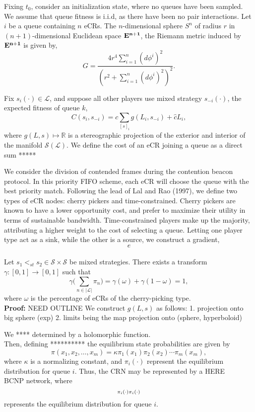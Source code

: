 \documentclass[10pt]{article}
\newcommand{\mcL}{\mathcal{L}}
\newcommand{\mcS}{\mathcal{S}}
\theoremstyle{definition}
\begin{document}
Fixing $t_0$, consider an initialization state, where no queues have been
sampled. We assume that queue fitness is i.i.d, as there
have been no pair interactions. 
Let $i$ be a queue containing $n$ eCRs. The $n$-dimensional sphere $S^n$
of radius $r$ in $(n+1)$-dimensional Euclidean space $\bf{E}^{n+1}$, the
Riemann metric induced by $\bf{E}^{n+1}$ is given by,
$$
    G = \frac{4r^4\sum_{i=1}^n(d\phi^i)^2}{(r^2 + \sum_{i=1}^n(d\phi^i)^2)^2}.
$$

Fix $s_i(\cdot) \in \mcL$, and suppose all other players use mixed strategy
$s_{-i}(\cdot)$, the expected fitness of queue $k$, 
$$
   C(s_i, s_{-i}) = c\displaystyle\sum_{[s]_i} g(L_i, s_{-i}) + \hat c L_i,
$$
where $g(L,s)\mapsto \mathbb{R}$ is a stereographic projection of the
exterior and interior of the manifold $\mcS(\mcL)$. We define the cost of an eCR
joining a queue as a direct sum *****

We consider the division of contended frames during the contention beacon
protocol. In this priority FIFO scheme, each eCR will
choose the queue with the best priority match. Following the lead of Lal
and Rao (1997), we define two types of eCR nodes: cherry pickers and
time-constrained. Cherry pickers are known to have a lower opportunity cost, and
prefer to maximize their utility in terms of sustainable bandwidth. 
Time-constrained players make up the majority, attributing a higher weight to
the cost of selecting a queue. Letting one player type act as a sink, while the other
is a source, we construct a gradient,
$$
    e
$$
{\\ 
Let $s_1 <_{st} s_2 \in \mcS\times \mcS$ be mixed strategies.
There exists a transform $\gamma: [0,1] \rightarrow [0,1]$ such that 
$$
\gamma\bigg( \displaystyle\sum_{n \in \vert \mcL\vert} \pi_n\bigg ) =
\gamma(\omega) + \gamma(1-\omega) = 1,
$$
where $\omega$ is the percentage of eCRs of the cherry-picking type.
}\\
\textbf{Proof:} NEED OUTLINE
We construct $g(L,s)$ as follows: 
1. projection onto big sphere (exp)
2. limits being the map projection onto (sphere, hyperboloid)

We **** determined by a holomorphic function.\\
Then, defining  ********** the equilibrium state probabilities are given by
$$
    \displaystyle \pi (x_{1},x_{2},\ldots ,x_{m}) = \kappa \pi_{1}(x_{1}) \pi _{2}(x_{2})\cdots \pi_{m}(x_{m}),
$$
where $\kappa$ is a normalizing constant, and $\pi_i(\cdot)$ represent the
equilibrium distribution for queue $i$. Thus, the CRN may be represented by a
HERE\\
BCNP network, where
$$
    {\displaystyle \scriptstyle {\pi _{i}(\cdot )}} {\displaystyle \scriptstyle {\pi _{i}(\cdot )}}
$$
represents the equilibrium distribution for queue $i$.
\end{document}
